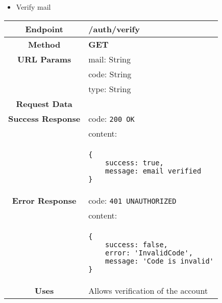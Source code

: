     \begin{itemize}
        \item Verify mail
    \end{itemize}
    \begin{adjustwidth}{1cm}{}
        \begin{longtable}{|c|l|}
            \hline
            \textbf{Endpoint} & /auth/verify \\
            \hline
            \textbf{Method} & \textbf{GET} \\
            \hline
            \textbf{URL Params} & mail: String \\
            &                     code: String \\
            &                     type: String \\
            \hline
            \textbf{Request Data} & \\
            \hline
            \textbf{Success Response} & code: \texttt{200 OK} \\
            &                           content: \\
            & \begin{minipage}[t]{0.5\textwidth}
                \begin{adjustwidth}{1.5cm}{}
                \begin{verbatim}
{
    success: true, 
    message: email verified
}
                \end{verbatim}
                \end{adjustwidth}
              \end{minipage} \\
              \hline
            \textbf{Error Response} & code: \texttt{401 UNAUTHORIZED} \\
            &                         content: \\
            & \begin{minipage}[t]{0.7\textwidth}
                \begin{adjustwidth}{1.5cm}{}
                \begin{verbatim}
{
    success: false, 
    error: 'InvalidCode',
    message: 'Code is invalid'
}
                \end{verbatim}
                \end{adjustwidth}
              \end{minipage} \\
              \hline
            \textbf{Uses} & Allows verification of the account \\
            \hline
        \end{longtable}
    \end{adjustwidth}
    
